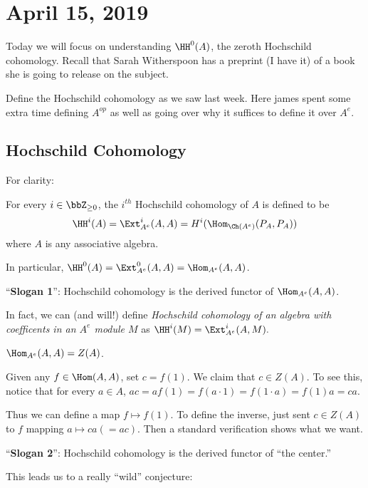 \documentclass[12pt]{article}
\begin{document}
\section{April 15, 2019}
Today we will focus on understanding $\HH^0(A)$, the zeroth Hochschild cohomology. Recall that 
Sarah Witherspoon has a preprint (I have it) of a book she is going to release on the subject.

Define the Hochschild cohomology as we saw last week. Here james spent some extra time defining $A^{op}$ 
as well as going over why it suffices to define it over $A^e$.

\subsection{Hochschild Cohomology}
For clarity:
\begin{defn}
	For every $i\in\bbZ_{\ge 0}$, the $i^{th}$ Hochschild cohomology of $A$ is defined to be
	\[\HH^i(A)=\Ext_{A^e}^i(A,A)=H^i(\Hom_{\Ch(A^e)}(P_A,P_A))\]
	where $A$ is any associative algebra.
\end{defn}
\begin{rmk}
	In particular, $\HH^0(A)=\Ext_{A^e}^0(A,A)=\Hom_{A^e}(A,A)$.
\end{rmk}
\begin{rmk}
	``\textbf{Slogan 1}'': Hochschild cohomology is the derived functor of $\Hom_{A^e}(A,A)$.
\end{rmk}
\begin{rmk}
	In fact, we can (and will!) define \textit{Hochschild cohomology of an algebra with coefficents
	in an $A^e$ module $M$} as $\HH^i(M)=\Ext_{A^e}^i(A,M).$
\end{rmk}
\begin{lem}
	$\Hom_{A^e}(A,A)=Z(A)$.
\end{lem}
\begin{prf}
	Given any $f\in \Hom(A,A)$, set $c=f(1)$. We claim that $c\in Z(A)$. To see this, notice that for 
	every $a\in A$, $ac=af(1)=f(a\cdot 1)=f(1\cdot a)=f(1)a=ca.$ 

	Thus we can define a map $f\mapsto f(1)$. To define the inverse, just sent $c\in Z(A)$ to 
	$f$ mapping $a\mapsto ca(=ac)$. Then a standard verification shows what we want.
\end{prf}
\begin{rmk}
	``\textbf{Slogan 2}'': Hochschild cohomology is the derived functor of ``the center.''
\end{rmk}
This leads us to a really ``wild'' conjecture:
\end{document}
